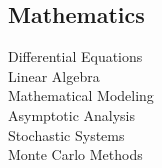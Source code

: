 \documentclass[letterpaper]{deedy-resume} %
\begin{document}
\begin{minipage}[t]{0.33\textwidth}
\sectionspace %

\subsection{Mathematics}

\textbullet{} Differential Equations \\
\textbullet{} Linear Algebra \\
\textbullet{} Mathematical Modeling \\
\textbullet{} Asymptotic Analysis \\
\textbullet{} Stochastic Systems \\
\textbullet{} Monte Carlo Methods \\

\sectionspace %



\end{minipage} %
\hfill
%
%
\end{document}
